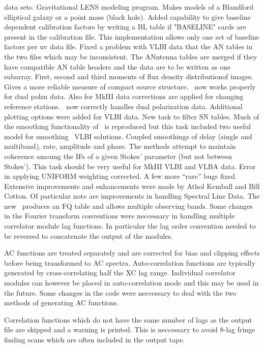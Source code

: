 \begin{description}
data sets.
\myitem{\GLENS} Gravitational LENS modeling program.  Makes models
of a Blandford elliptical galaxy or a point mass (black hole).
\myitem{\ANCAL} Added capability to give baseline dependent
calibration factors by writing a BL table if "BASELINE" cards
are present in the calibration file.  This implementation allows
only one set of baseline factors per uv data file.
\myitem{\DBCON} Fixed a problem with VLBI data that the AN
tables in the two files which may be inconsistent.
The ANntenna tables are merged if they have compatible AN table
headers and the data are to be written as one subarray.
\myitem{\MOMFT} First, second and third moments of flux density
distributionof images.
Gives a more reliable measure of compact source structure.
\myitem{\CVEL} \CVEL\ now works properly for dual polzn data.
Also for MkIII data corrections are applied for changing
reference stations.
\myitem{\ACFIT} \ACFIT\ now correctly handles dual polarization data.
\myitem{\SNPLT} Additional plotting options were added for VLBI data.
\myitem{\SNSMO}
New task to filter SN tables.  Much of the smoothing
functionality of \CLCAL\ is reproduced but this task included two
useful model for smoothing \FRING\ VLBI solutions.  Coupled
smoothings of delay (single and multiband), rate, amplitude and
phase.  The methods attempt to maintain coherence amoung the IFs
of a given Stokes' parameter (but not between Stokes').  This
task should be very useful for MkIII VLBI and VLBA data.
\myitem{\HORUS} Error in applying UNIFORM weighting corrected.
\myitem{\FILLM} A few more ``rare'' bugs fixed.
\myitem{\MKTIN} Extensive improvements and enhancements were
made by Athol Kemball and Bill Cotton.
Of particular note are improvements in handling Spectral Line Data.
The new \MKTIN\ produces an FQ table and allows multiple
observing bands.
Some changes in the Fourier transform conventions were
neccessary in handling multiple correlator module lag functions.
In particular the lag order convention needed to be reversed to
concatenate the output of the modules.

AC functions are treated separately and are corrected for bias
and clipping effects before being transformed to AC spectra.
Auto-correlation functions are typically generated by
cross-correlating half the XC lag range. Individual correlator
modules can however be placed in auto-correlation mode and this
may be used in the future.  Some changes in the code were
neccessary to deal with the two methods of generating AC functions.

Correlation functions which do not have the same number of
lags as the output file are skipped and a warning is printed.
This is neccessary to avoid 8-lag fringe finding scans which are
often included in the output tape.


\end{description}
